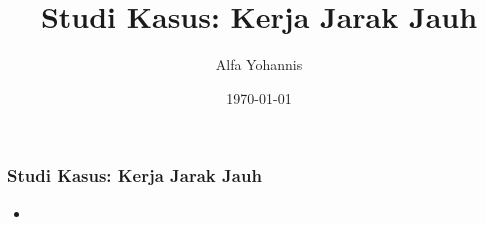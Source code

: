 \documentclass{beamer}
\title{Studi Kasus: Kerja Jarak Jauh}
\author{Alfa Yohannis}
\date{\today}
\begin{document}
	
	\frame{\titlepage}
	
	\begin{frame}
		\frametitle{Studi Kasus: Kerja Jarak Jauh}
		\begin{itemize}
			\item 
		\end{itemize}
	\end{frame}
		
\end{document}
